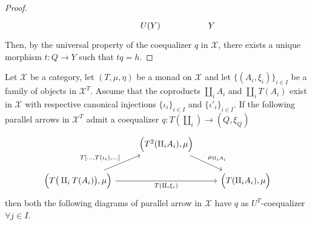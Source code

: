 \begin{subbox}{}
\begin{proof}
\[\begin{tikzcd}
                                                                                                                                          &  & U(Y)                                                                                                                   &  & Y                                                                                                           
\end{tikzcd}
    \]
    Then, by the universal property of the coequalizer $q$ in $\mathcal{X}$, there exists a unique morphism $t:Q \to Y$ such that $tq=h$.
\end{proof}
\end{subbox}

\begin{mainbox}{}
\begin{prop}\label{coeq for the three diagrams}
    Let $\mathcal{X}$ be a category, let $(T,\mu,\eta)$ be a monad on $\mathcal{X}$ and let $\{(A_i,\xi_i)\}_{i\in I}$ be a family of objects in $\mathcal{X}^T$. Assume that the coproducts $\amalg_iA_i$ and $\amalg_iT(A_i)$ exist in $\mathcal{X}$ with respective canonical injections $\{\iota_i\}_{i\in I}$ and $\{\iota'_i\}_{i\in I}$. If the following parallel arrows in 
    $\mathcal{X}^T$ admit a coequalizer $q:T(\amalg_i)\to (Q,\xi_Q)$
    \begin{equation}\label{diagr 1 coproducts}
\begin{tikzcd}
                                                                                                                  & {\Big(T^2(\amalg_iA_i),\mu\Big)} \arrow[rd, "\mu_{\amalg_iA_i}"] &                              \\
{\Big(T\big(\amalg_iT(A_i)\big),\mu\Big)} \arrow[rr, "T(\amalg_i\xi_i)"'] \arrow[ru, "{T[\ldots,T(\iota_i),\ldots]}"] &                                                              & {\Big(T(\amalg_iA_i),\mu\Big)}
\end{tikzcd}
\end{equation}
    then both the following diagrams of parallel arrow in $\mathcal{X}$ have $q$ as $U^T$-coequalizer $\forall j \in I$.
\begin{equation}\label{diagr 2 coproducts}

\end{equation}
\end{prop}
\end{mainbox}
